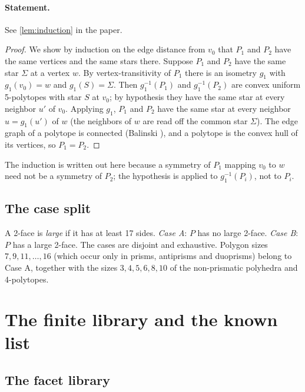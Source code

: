 \documentclass[11pt]{article}
\theoremstyle{definition}
\theoremstyle{remark}
\begin{document}
\paragraph{Statement.} See \ref{lem:induction} in the paper.

\begin{proof}
We show by induction on the edge distance from $v_0$ that $P_1$ and $P_2$
have the same vertices and the same stars there. Suppose $P_1$ and $P_2$
have the same star $\Sigma$ at a vertex $w$. By vertex-transitivity of
$P_1$ there is an isometry $g_1$ with $g_1(v_0)=w$ and $g_1(S)=\Sigma$.
Then $g_1^{-1}(P_1)$ and $g_1^{-1}(P_2)$ are convex uniform 5-polytopes
with star $S$ at $v_0$; by hypothesis they have the same star at every
neighbor $u'$ of $v_0$. Applying $g_1$, $P_1$ and $P_2$ have the same
star at every neighbor $u=g_1(u')$ of $w$ (the neighbors of $w$ are
read off the common star $\Sigma$). The edge graph of a polytope is
connected (Balinski \cite{Balinski1961}), and a polytope is the convex
hull of its vertices, so $P_1=P_2$.
\end{proof}

The induction is written out here because a symmetry of $P_1$ mapping
$v_0$ to $w$ need not be a symmetry of $P_2$; the hypothesis is applied to
$g_1^{-1}(P_i)$, not to $P_i$.

\subsection{The case split}

A 2-face is \emph{large} if it has at least 17 sides. \emph{Case A}: $P$
has no large 2-face. \emph{Case B}: $P$ has a large 2-face. The cases are
disjoint and exhaustive. Polygon sizes $7,9,11,\dots,16$ (which occur only
in prisms, antiprisms and duoprisms) belong to Case A, together with the
sizes $3,4,5,6,8,10$ of the non-prismatic polyhedra and 4-polytopes.

\section{The finite library and the known list}\label{sec:known}

\subsection{The facet library}\label{sec:library}
\end{document}
